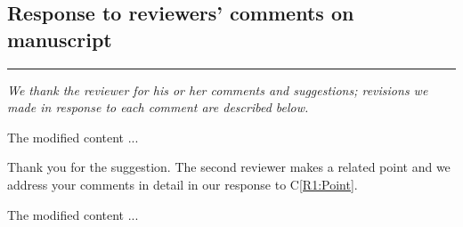 \documentclass[12pt]{article}
\begin{document}
\pagewiselinenumbers

\begin{center}
	\section*{\Huge Response to reviewers’ comments on manuscript}	
\end{center}

\hrule



%
%
%

\hspace{2cm}



\reviewersection

\textit{We thank the reviewer for his or her comments and suggestions;
revisions we made in response to each comment are described below.}

\begin{comment}
	\lipsum[2]
	\label{R1:Point}
\end{comment}

\begin{response}
	\lipsum[3]
\end{response}

\begin{recompose}
	The modified content ...
\end{recompose}  

\begin{comment}
	\lipsum[11]
\end{comment}

\begin{response}
Thank you for the suggestion. The second reviewer makes a related point and we address your comments in detail in our response to C\ref{R1:Point}.
\end{response}

\begin{recompose}
	The modified content ...
\end{recompose} 

\clearpage

\reviewersection
\end{document}

